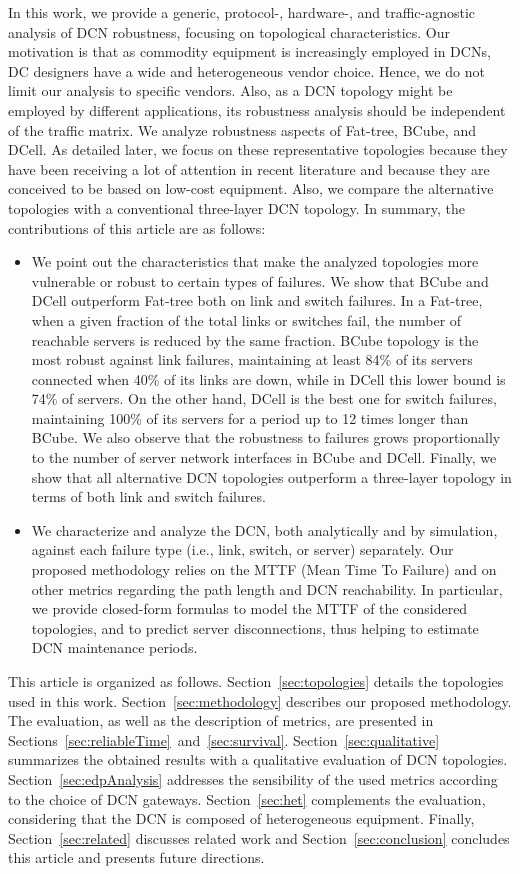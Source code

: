 In this work, we provide a generic, protocol-, hardware-, and traffic-agnostic analysis of DCN robustness, focusing on topological characteristics. Our motivation is that as commodity equipment is increasingly employed in DCNs, DC designers have a wide and heterogeneous vendor choice. Hence, we do not limit our analysis to specific vendors. Also, as a DCN topology might be employed by different applications, its robustness analysis should be independent of the traffic matrix. We analyze robustness aspects of Fat-tree, BCube, and DCell. As detailed later, we focus on these representative topologies because they have been receiving a lot of attention in recent literature and because they are conceived to be based on low-cost equipment. Also, we compare the alternative topologies with a conventional three-layer DCN topology. In summary, the contributions of this article are as follows:
\begin{itemize}
\item We point out the characteristics that make the analyzed topologies more vulnerable or robust to certain types of failures. We show that BCube and DCell outperform Fat-tree both on link and switch failures. In a Fat-tree, when a given fraction of the total links or switches fail, the number of reachable servers is reduced by the same fraction. BCube topology is the most robust against link failures, maintaining at least 84\% of its servers connected when 40\% of its links are down, while in DCell this lower bound is 74\% of servers. On the other hand, DCell is the best one for switch failures, maintaining 100\% of its servers for a period up to 12 times longer than BCube. We also observe that the robustness to failures grows proportionally to the number of server network interfaces in BCube and DCell. Finally, we show that all alternative DCN topologies outperform a three-layer topology in terms of both link and switch failures. 
\item We characterize and analyze the DCN, both analytically and by simulation, against each failure type (i.e., link, switch, or server) separately. Our proposed methodology relies on the MTTF (Mean Time To Failure) and on other metrics regarding the path length and DCN reachability. In particular, we provide closed-form formulas to model the MTTF of the considered topologies, and to predict server disconnections, thus helping to estimate DCN maintenance periods. 
\end{itemize}

This article is organized as follows. Section~\ref{sec:topologies} details the topologies used in this work. Section~\ref{sec:methodology} describes our proposed methodology. The evaluation, as well as the description of metrics, are presented in Sections~\ref{sec:reliableTime}~and~\ref{sec:survival}. Section~\ref{sec:qualitative} summarizes the obtained results with a qualitative evaluation of DCN topologies. Section~\ref{sec:edpAnalysis} addresses the sensibility of the used metrics according to the choice of DCN gateways. Section~\ref{sec:het} complements the evaluation, considering that the DCN is composed of heterogeneous equipment. Finally, Section~\ref{sec:related} discusses related work and Section~\ref{sec:conclusion} concludes this article and presents future directions. 

